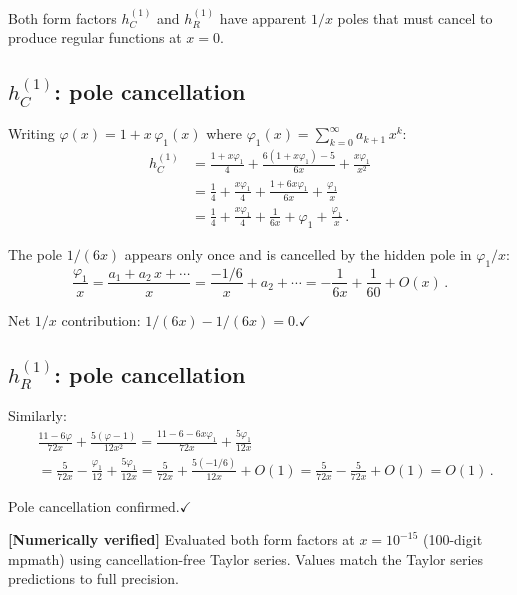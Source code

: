 \documentclass[11pt,a4paper]{article}
\theoremstyle{definition}
\theoremstyle{remark}
\newcommand{\verified}[1]{%
  \par\noindent\colorbox{green!10}{%
    \parbox{\dimexpr\linewidth-2\fboxsep}{%
      \textcolor{green!50!black}{\textbf{[Numerically verified]}}
      \textcolor{green!50!black}{#1}%
    }%
  }\par%
}
\begin{document}
Both form factors $h_C^{(1)}$ and $h_R^{(1)}$ have apparent
$1/x$ poles that must cancel to produce regular functions at $x = 0$.

\subsection{$h_C^{(1)}$: pole cancellation}

Writing $\varphi(x) = 1 + x\,\varphi_1(x)$ where
$\varphi_1(x) = \sum_{k=0}^\infty a_{k+1}\,x^k$:
\begin{align*}
  h_C^{(1)} &= \frac{1+x\varphi_1}{4}
  + \frac{6(1+x\varphi_1) - 5}{6x}
  + \frac{x\varphi_1}{x^2}\\
  &= \frac{1}{4} + \frac{x\varphi_1}{4}
  + \frac{1+6x\varphi_1}{6x}
  + \frac{\varphi_1}{x}\\
  &= \frac{1}{4} + \frac{x\varphi_1}{4}
  + \frac{1}{6x} + \varphi_1
  + \frac{\varphi_1}{x}\,.
\end{align*}

The pole $1/(6x)$ appears only once and is cancelled by the
hidden pole in $\varphi_1/x$:
\begin{equation*}
  \frac{\varphi_1}{x} = \frac{a_1 + a_2\,x + \cdots}{x}
  = \frac{-1/6}{x} + a_2 + \cdots
  = -\frac{1}{6x} + \frac{1}{60} + O(x)\,.
\end{equation*}

Net $1/x$ contribution: $1/(6x) - 1/(6x) = 0$.\quad$\checkmark$

\subsection{$h_R^{(1)}$: pole cancellation}

Similarly:
\begin{align*}
  &\frac{11 - 6\varphi}{72x} + \frac{5(\varphi-1)}{12x^2}
  = \frac{11-6-6x\varphi_1}{72x} + \frac{5\varphi_1}{12x}\\
  &= \frac{5}{72x} - \frac{\varphi_1}{12}
  + \frac{5\varphi_1}{12x}
  = \frac{5}{72x} + \frac{5(-1/6)}{12x} + O(1)
  = \frac{5}{72x} - \frac{5}{72x} + O(1) = O(1)\,.
\end{align*}

Pole cancellation confirmed.\quad$\checkmark$

\verified{Evaluated both form factors at $x = 10^{-15}$
(100-digit mpmath) using cancellation-free Taylor series.
Values match the Taylor series predictions to full precision.}


\end{document}
